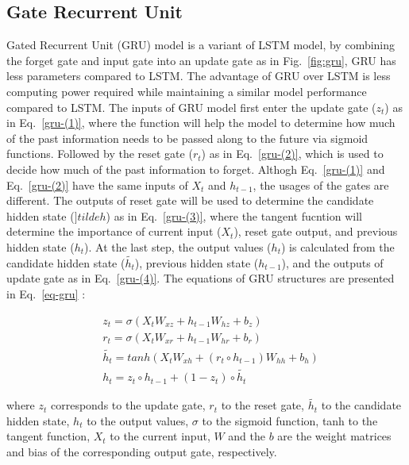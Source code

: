 \subsection{Gate Recurrent Unit}
Gated Recurrent Unit (GRU) model is a variant of LSTM model, by combining the forget gate and input gate into an update gate as in Fig.~\ref{fig:gru}, GRU has less parameters compared to LSTM. The advantage of GRU over LSTM is less computing power required while maintaining a similar model performance compared to LSTM. The inputs of GRU model first enter the update gate ($z_t$) as in Eq.~\ref{gru-(1)}, where the function will help the model to determine how much of the past information needs to be passed along to the future via sigmoid functions. Followed by the reset gate ($r_t$) as in Eq.~\ref{gru-(2)}, which is used to decide how much of the past information to forget. Althogh Eq.~\ref{gru-(1)} and Eq.~\ref{gru-(2)} have the same inputs of $X_t$ and $h_{t-1}$, the usages of the gates are different. The outputs of reset gate will be used to determine the candidate hidden state ($]tilde{h}$) as in Eq.~\ref{gru-(3)}, where the tangent fucntion will determine the importance of current input ($X_t$), reset gate output, and previous hidden state ($h_t$). At the last step, the output values ($h_t$) is calculated from the candidate hidden state ($\tilde{h_t}$), previous hidden state ($h_{t-1}$), and the outputs of update gate as in Eq.~\ref{gru-(4)}. The equations of GRU structures are presented in Eq.~\ref{eq-gru} \citep{chengForecastingWastewaterTreatment2020}:

\begin{subequations} \label{eq-gru}
  \begin{align}
      &z_t=\sigma(X_tW_{xz}+h_{t-1}W_{hz}+b_z) \label{gru-(1)}\\
      &r_t=\sigma(X_tW_{xr}+h_{t-1}W_{hr}+b_r) \label{gru-(2)}\\
      &\tilde{h_t}=tanh(X_tW_{xh}+(r_t\circ h_{t-1})W_{hh}+b_h) \label{gru-(3)}\\
      &h_t=z_t\circ h_{t-1}+(1-z_t)\circ \tilde{h_t} \label{gru-(4)}
  \end{align}
\end{subequations}

\noindent
where $z_t$ corresponds to the update gate, $r_t$ to the reset gate, $\tilde{h_t}$ to the candidate hidden state, $h_t$ to the output values, $\sigma$ to the sigmoid function, tanh to the tangent function, $X_t$ to the current input, $W$ and the $b$ are the weight matrices and bias of the corresponding output gate, respectively.

